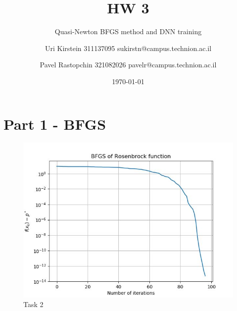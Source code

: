 \documentclass[12pt]{scrartcl}
\begin{document}

\titlehead{CS department, Technion}
\subject{Introduction to Optimization and Deep Learning 236330}
\title{HW 3}
\subtitle{Quasi-Newton BFGS method and DNN training}
\author{Uri Kirstein 311137095 \hfill sukirstn@campus.technion.ac.il\and Pavel Rastopchin 321082026 pavelr@campus.technion.ac.il}
\date{\today}
\maketitle

\section*{Part 1 - BFGS}
\begin{figure}[h!]
	\hfill\includegraphics{rosenbrock_graph.jpg}\hspace*{\fill}
	\caption{Task 2}
\end{figure}
\end{document}

